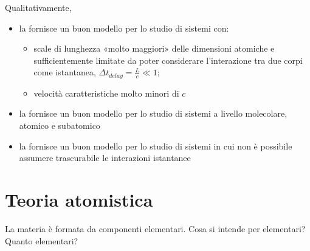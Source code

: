 \documentclass[letterpaper,10pt,italian]{jupyterBook}
\begin{document}
\sphinxAtStartPar
Qualitativamente,
\begin{itemize}
\item {} 
\sphinxAtStartPar
la  fornisce un buon modello per lo studio di sistemi con:
\begin{itemize}
\item {} 
\sphinxAtStartPar
scale di lunghezza «molto maggiori» delle dimensioni atomiche e sufficientemente limitate da poter considerare l’interazione tra due corpi come istantanea, \(\Delta t_{delay} = \frac{L}{c} \ll 1\);

\item {} 
\sphinxAtStartPar
velocità caratteristiche molto minori di \(c\)

\end{itemize}

\item {} 
\sphinxAtStartPar
la  fornisce un buon modello per lo studio di sistemi a livello molecolare, atomico e sub\sphinxhyphen{}atomico

\item {} 
\sphinxAtStartPar
la  fornisce un buon modello per lo studio di sistemi in cui non è possibile assumere trascurabile le interazioni istantanee

\end{itemize}


\section{Teoria atomistica}
\label{\detokenize{ch/intro/current-status:teoria-atomistica}}\label{\detokenize{ch/intro/current-status:physics-hs-intro-current-status-micro-macro}}
\sphinxAtStartPar
La materia è formata da componenti elementari. Cosa si intende per elementari? Quanto elementari?
\end{document}
